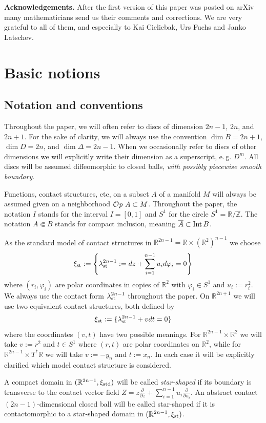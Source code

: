 \documentclass[12pt]{paper}
\theoremstyle{plain}
\theoremstyle{definition}
\newcommand{\ol}{\overline}
\newcommand{\p}{\partial}
\newcommand{\Z}{{\mathbb{Z}}}
\newcommand{\R}{{\mathbb{R}}}
\newcommand{\st}{{\rm st}}
\newcommand{\Int}{{\rm Int\,}} %
\newcommand{\std}{{\rm std}}
\def\Op{{\mathcal O}{\it p}\,}
\numberwithin{figure}{section}
\begin{document}
 {\bf Acknowledgements.}
 After the first version of this paper was posted on arXiv many mathematicians send us their comments and corrections. We are very grateful to all of them, and  especially  to Kai Cieliebak, Urs Fuchs and Janko Latschev.
 
\section{Basic notions}\label{sec:basic}
 \subsection{Notation and conventions}\label{sec:notation}
Throughout the paper, we will often refer to discs of dimension $2n-1$, $2n$, and $2n+1$. For the sake of clarity, we will always use the convention $\dim B=2n+1$, $\dim D = 2n$, and $\dim \Delta = 2n-1$. When we occasionally refer to discs of other dimensions we will explicitly write their dimension as a superscript, e.\,g. $D^{m}$. All discs will be assumed      diffeomorphic to closed balls, \emph{with possibly piecewise smooth boundary}.  

Functions, contact structures, etc, on a subset $A$ of a manifold $M$ will always be assumed given on a neighborhood $\Op\,A\subset M$.
Throughout the paper, the notation $I$ stands for the  interval $I= [0,1]$ and $S^1$ for   the circle $S^1 = \R/\Z$. The notation $A \Subset B$ stands for compact inclusion, meaning $\ol A \subset \Int B$.

 
As the standard model  of contact structures in $\R^{2n-1}=\R\times(\R^2)^{n-1}$ we choose
$$\xi_\st:=\left\{\lambda_\st^{2n-1}:=dz+\sum_{i=1}^{n-1} u_id\varphi_i=0\right\}$$ where
$(r_i,\varphi_i)$ are polar coordinates in copies of $\R^2$ with $\varphi_i \in S^1$ and $u_i:=r_i^2$. 
We always use the contact form $\lambda_\st^{2n-1}$ throughout the paper. %
On $\R^{2n+1}$ we will use two equivalent  contact structures, both defined by 
$$
	\xi_\st:= \{\lambda_\st^{2n-1} + vdt = 0\}
$$  
where the coordinates $(v,t)$ have two possible meanings.  For $\R^{2n-1} \times \R^2$ we will take
$v := r^2$ and $t \in S^1$ where $(r,t)$ are polar coordinates on $\R^2$, while for
$\R^{2n-1} \times T^*\R$ we will take $v := -y_n$ and $t:= x_n$.
In each case it will be explicitly clarified which model contact structure is  considered. 

 
A compact domain in $(\R^{2n-1}, \xi_\std)$ will be called {\em star-shaped} if its boundary is transverse to the contact vector field $Z
 = z\frac{\p}{\p z}+\sum_{i=1}^{n-1}u_i\frac{\p}{\p u_i}$. An abstract contact $(2n-1)$-dimensional closed ball will be called star-shaped if it is contactomorphic to a star-shaped domain in $(\R^{2n-1}, \xi_\st)$. 
\end{document}

